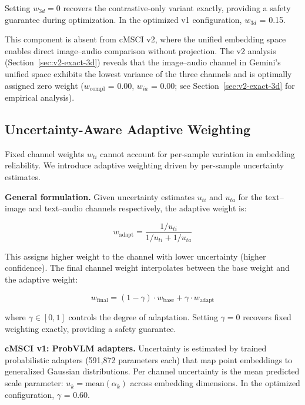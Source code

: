 \documentclass[a4paper,fleqn]{cas-sc}
\begin{document}
\begin{itemize}
Setting $w_{3d} = 0$ recovers the contrastive-only variant exactly, providing a safety guarantee during optimization. In the optimized v1 configuration, $w_{3d}$ = 0.15.

This component is absent from cMSCI v2, where the unified embedding space enables direct image--audio comparison without projection. The v2 analysis (Section~\ref{sec:v2-exact-3d}) reveals that the image--audio channel in Gemini's unified space exhibits the lowest variance of the three channels and is optimally assigned zero weight ($w_{\mathrm{compl}}$ = 0.00, $w_{ia}$ = 0.00; see Section~\ref{sec:v2-exact-3d} for empirical analysis).


\subsection{Uncertainty-Aware Adaptive Weighting}\label{sec:adaptive-weighting}

Fixed channel weights $w_{ti}$ cannot account for per-sample variation in embedding reliability. We introduce adaptive weighting driven by per-sample uncertainty estimates.

\textbf{General formulation.} Given uncertainty estimates $u_{ti}$ and $u_{ta}$ for the text--image and text--audio channels respectively, the adaptive weight is:

\begin{equation}\label{eq:adaptive-weight}
w_{\mathrm{adapt}} = \frac{1/u_{ti}}{1/u_{ti} + 1/u_{ta}}
\end{equation}

This assigns higher weight to the channel with lower uncertainty (higher confidence). The final channel weight interpolates between the base weight and the adaptive weight:

\begin{equation}\label{eq:final-weight}
w_{\mathrm{final}} = (1 - \gamma) \cdot w_{\mathrm{base}} + \gamma \cdot w_{\mathrm{adapt}}
\end{equation}

where $\gamma \in [0, 1]$ controls the degree of adaptation. Setting $\gamma = 0$ recovers fixed weighting exactly, providing a safety guarantee.

\textbf{cMSCI v1: ProbVLM adapters.} Uncertainty is estimated by trained probabilistic adapters (591,872 parameters each) that map point embeddings to generalized Gaussian distributions. Per channel uncertainty is the mean predicted scale parameter: $u_k = \mathrm{mean}(\alpha_k)$ across embedding dimensions. In the optimized configuration, $\gamma$ = 0.60.


\end{itemize}
\end{document}
